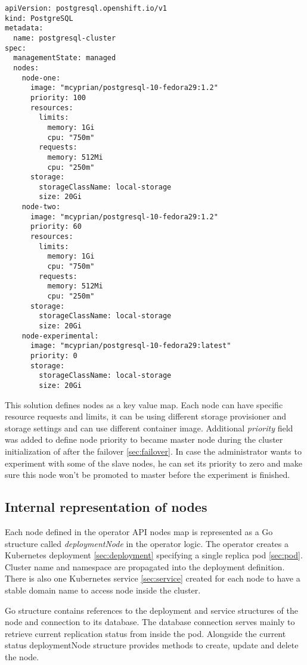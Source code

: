 \documentclass[
  digital, %
  twoside, %
  table,   %
  lof,     %
  lot,     %
]{fithesis3}
\begin{document}
\begin{lstlisting}
apiVersion: postgresql.openshift.io/v1
kind: PostgreSQL
metadata:
  name: postgresql-cluster
spec:
  managementState: managed
  nodes:
    node-one:
      image: "mcyprian/postgresql-10-fedora29:1.2"
      priority: 100
      resources:
        limits:
          memory: 1Gi
          cpu: "750m"
        requests:
          memory: 512Mi
          cpu: "250m"
      storage:
        storageClassName: local-storage
        size: 20Gi
    node-two:
      image: "mcyprian/postgresql-10-fedora29:1.2"
      priority: 60
      resources:
        limits:
          memory: 1Gi
          cpu: "750m"
        requests:
          memory: 512Mi
          cpu: "250m"
      storage:
        storageClassName: local-storage
        size: 20Gi
    node-experimental:
      image: "mcyprian/postgresql-10-fedora29:latest"
      priority: 0
      storage:
        storageClassName: local-storage
        size: 20Gi
\end{lstlisting}

This solution defines nodes as a key value map. Each node can have specific resource requests and limits, it can be using different storage provisioner and storage settings and can use different container image. Additional \textit{priority} field was added to define node priority to became master node during the cluster initialization of after the failover \ref{sec:failover}. In case the administrator wants to experiment with some of the slave nodes, he can set its priority to zero and make sure this node won't be promoted to master before the experiment is finished.

\subsection{Internal representation of nodes}
 Each node defined in the operator API nodes map is represented as a Go structure called \textit{deploymentNode} in the operator logic. The operator creates a Kubernetes deployment \ref{sec:deployment} specifying a single replica pod \ref{sec:pod}. Cluster name and namespace are propagated into the deployment definition. There is also one Kubernetes service \ref{sec:service} created for each node to have a stable domain name to access node inside the cluster.
 
 Go structure contains references to the deployment and service structures of the node and connection to its database. The database connection serves mainly to retrieve current replication status from inside the pod. Alongside the current status deploymentNode structure provides methods to create, update and delete the node.
 
\end{document}
